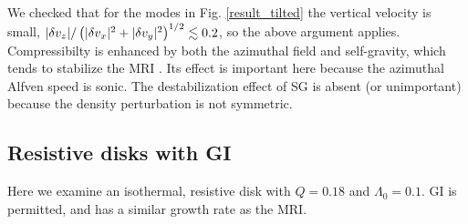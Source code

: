 We checked that for the modes in Fig. \ref{result_tilted} the vertical
velocity is small, $|\delta v_z|/\left(|\delta v_x|^2+|\delta v_y|^2\right)^{1/2}
\lesssim 0.2$, so the above argument applies. Compressibilty is 
enhanced by both the azimuthal field and self-gravity, which tends
to stabilize the MRI \citep{kim00}. Its effect is important here  
because the azimuthal Alfven speed is sonic. The destabilization
effect of SG is absent (or unimportant) because the density
perturbation is not symmetric.  





\subsection{Resistive disks with GI}
Here we examine an isothermal, resistive disk with $Q=0.18$ and
$\Lambda_0=0.1$. GI is permitted, and has a similar growth rate as the
MRI. 




